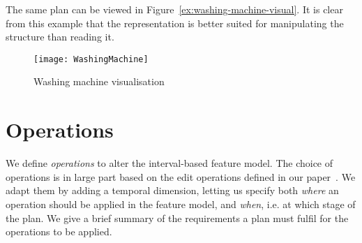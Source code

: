 The same plan can be viewed in Figure~\vref{ex:washing-machine-visual}. It is clear from this example that the representation is better suited for manipulating the structure than reading it. 

\begin{figure}
  \centering
  \texttt{[image: WashingMachine]}
  \caption{Washing machine visualisation}
  \label{ex:washing-machine-visual}
\end{figure}

\section{Operations}
\label{sec:operations}

We define \emph{operations} to alter the interval-based feature model. The choice of operations is in large part based on the edit operations defined in our paper~\cite{art:consistency-preserving-evolution-planning}. We adapt them by adding a temporal dimension, letting us specify both \emph{where} an operation should be applied in the feature model, and \emph{when}, i.e. at which stage of the plan. We give a brief summary of the requirements a plan must fulfil for the operations to be applied.


